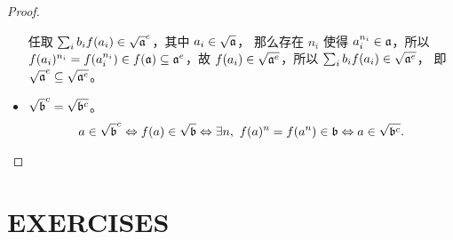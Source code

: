 \begin{proof}
\begin{itemize}[nosep]
    任取 $\sum_i b_i f(a_i)\in \sqrt{\mathfrak{a}}^e$，其中 $a_i\in\sqrt{\mathfrak{a}}$，
    那么存在 $n_i$ 使得 $a_i^{n_i}\in\mathfrak{a}$，所以
    $f(a_i)^{n_i}=f(a_i^{n_i})\in f(\mathfrak{a})\subseteq\mathfrak{a}^e$，故
    $f(a_i)\in\sqrt{\mathfrak{a}^e}$，所以 $\sum_i b_if(a_i)\in\sqrt{\mathfrak{a}^e}$，
    即 $\sqrt{\mathfrak{a}}^e\subseteq\sqrt{\mathfrak{a}^e}$。
    \item $\sqrt{\mathfrak{b}}^c=\sqrt{\mathfrak{b}^c}$。
    \[
        a\in\sqrt{\ideal b}^c\Leftrightarrow
        f(a)\in\sqrt{\ideal b}\Leftrightarrow\exists n,\ 
        f(a)^n=f(a^n)\in\ideal b
        \Leftrightarrow a\in\sqrt{\ideal b^c}.\qedhere
    \]
  \end{itemize}
\end{proof}

\section{EXERCISES}


